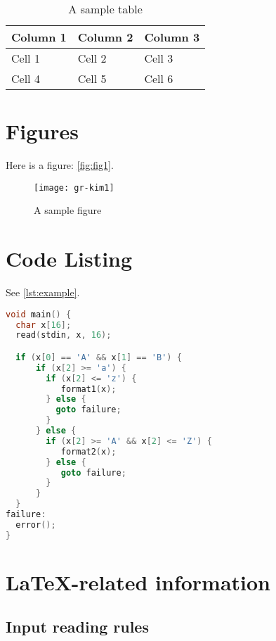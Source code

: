 \begin{table}[!h]
  \centering
  \begin{tabular}{|l|l|l|}
    \hline
    Column 1 & Column 2 & Column 3 \\ \hline
    Cell 1   & Cell 2   & Cell 3   \\ \hline
    Cell 4   & Cell 5   & Cell 6   \\ \hline
  \end{tabular}
  \caption{A sample table}
  \label{tab:tab_label}

\end{table}

\section{Figures}

Here is a figure: \autoref{fig:fig1}.

\begin{figure}[!h]
  \centering
  \texttt{[image: gr-kim1]}
  \caption{A sample figure}%
  \label{fig:fig1}
\end{figure}


\section{Code Listing}


See \autoref{lst:example}.

\begin{lstlisting}[float, floatplacement=!h, language=C, caption= {An Example For
  Code Listing}, label={lst:example}]
void main() {
  char x[16];
  read(stdin, x, 16);

  if (x[0] == 'A' && x[1] == 'B') {
      if (x[2] >= 'a') {
        if (x[2] <= 'z') {
           format1(x);
        } else {
          goto failure;
        }
      } else {
        if (x[2] >= 'A' && x[2] <= 'Z') {
           format2(x);
        } else {
           goto failure;
        }
      }
  }
failure:
  error();
}
\end{lstlisting}


\section{\LaTeX-related information}

\subsection{Input reading rules}

